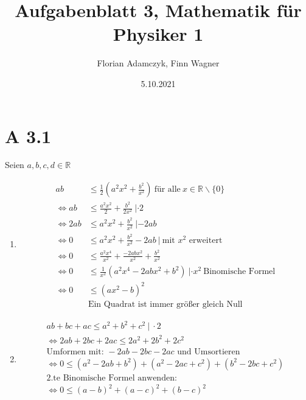 \documentclass{article}
\date{5.10.2021}
\title{Aufgabenblatt 3, Mathematik für Physiker 1}
\author{Florian Adamczyk, Finn Wagner}
\begin{document}
    \maketitle
    
    \section*{A 3.1}
       Seien \(a, b, c, d \in \mathbb{R}\)
       \begin{enumerate}[label = (\alph*)]
            \item 
                \begin{align*}
                    ab & \leq \frac{1}{2} (a^2 x^2 + \frac{b^2}{x^2}) \: \text{für alle} \: x \in \mathbb{R} \backslash \{0\} \\
                    \Leftrightarrow ab & \leq \frac{a^2 x^2}{2} + \frac{b^2}{2x^2} \: | \cdot 2 \\
                    \Leftrightarrow 2ab & \leq a^2 x^2 + \frac{b^2}{x^2} \: | -2ab \\
                    \Leftrightarrow 0 & \leq a^2 x^2 + \frac{b^2}{x^2} - 2ab \: | \: \text{mit } x^2 \text{ erweitert} \\ 
                    \Leftrightarrow 0 & \leq \frac{a^2 x^4}{x^2} + \frac{-2abx^2}{x^2} + \frac{b^2}{x^2} \\
                    \Leftrightarrow 0 & \leq \frac{1}{x^2} (a^2 x^4  - 2abx^2 + b^2) \: | \cdot x^2 \: \text{Binomische Formel} \\
                    \Leftrightarrow 0 & \leq {(ax^2 - b)}^2 \\
                    & \text{Ein Quadrat ist immer größer gleich Null}
                \end{align*}
            \item 
                \begin{gather*}
                    ab + bc + ac \leq a^2 + b^2 + c^2 \ | \: \cdot 2\\
                    \Leftrightarrow 2ab + 2bc + 2ac \leq 2a^2 + 2b^2 + 2c^2 \\
                    \text{Umformen mit: } -2ab -2bc -2ac \text{ und Umsortieren}\\
                    \Leftrightarrow 0 \leq (a^2 -2ab + b^2) + (a^2 -2ac + c^2) + (b^2 -2bc + c^2) \\
                    \text{2.te Binomische Formel anwenden:} \\
                    \Leftrightarrow 0 \leq {(a - b)}^2 + {(a - c)}^2 + {(b - c)}^2 \\

\end{gather*}
\end{enumerate}
\end{document}
